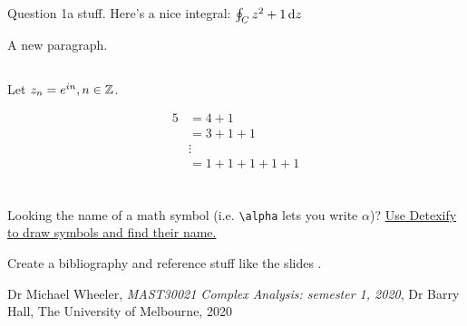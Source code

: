 \documentclass{article}
\begin{document}

\section{}
{
    \subsection{}
    {
        Question 1a stuff. Here's a nice integral: $\oint_{C} z^2+1 \mathop{}\!\mathrm{d} z$ \par
        A new paragraph.
    }

    \subsection{}
    {
        Let $z_n = e^{in}, n \in \mathbb{Z}$.

        \begin{align*}
            5 &= 4 + 1 \\
            &= 3 + 1 + 1 \\
            &\vdots \\
            &= 1+1+1+1+1
        \end{align*}
    }
}

\section{}
{
    Looking the name of a math symbol (i.e. \verb`\alpha` lets you write $\alpha$)?
    \href{https://detexify.kirelabs.org/}{Use Detexify to draw symbols and find their name.} \par

    Create a bibliography and reference stuff like the slides \cite[p.~1]{wheeler_cpx_notes}.
}


\begin{thebibliography}{9}
    
        Dr Michael Wheeler,
        \textit{MAST30021 Complex Analysis: semester 1, 2020},
        Dr Barry Hall,
        The University of Melbourne,
        2020

\end{thebibliography}
\end{document}
